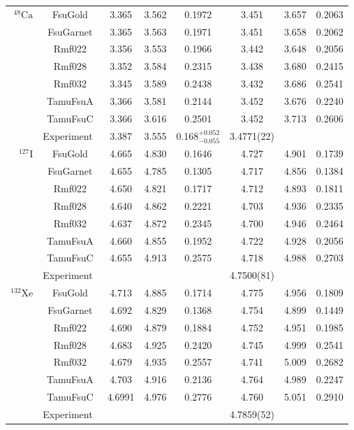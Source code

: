 \begin{longtable}{@{\extracolsep{\fill}}r || c | *{3}{c} | *{3}{c}}
\hline
$^{48}\mathrm{Ca}$ & FsuGold & 3.365 & 3.562 & 0.1972 & 3.451 & 3.657 & 0.2063 \\
 & FsuGarnet & 3.365 & 3.563 & 0.1971 & 3.451 & 3.658 & 0.2062 \\
 & Rmf022 & 3.356 & 3.553 & 0.1966 & 3.442 & 3.648 & 0.2056 \\
 & Rmf028 & 3.352 & 3.584 & 0.2315 & 3.438 & 3.680 & 0.2415 \\
 & Rmf032 & 3.345 & 3.589 & 0.2438 & 3.432 & 3.686 & 0.2541 \\
 & TamuFsuA & 3.366 & 3.581 & 0.2144 & 3.452 & 3.676 & 0.2240 \\
 & TamuFsuC & 3.366 & 3.616 & 0.2501 & 3.452 & 3.713 & 0.2606 \\ \hline 
 & Experiment~\cite{angeli:2013:table, zenihiro:2018:direct} & 3.387 & 3.555 & 0.168$^{+0.052}_{-0.055}$ & 3.4771(22) &  &  \\
\hline
$^{127}\mathrm{I}$ & FsuGold & 4.665 & 4.830 & 0.1646 & 4.727 & 4.901 & 0.1739 \\
 & FsuGarnet & 4.655 & 4.785 & 0.1305 & 4.717 & 4.856 & 0.1384 \\  
 & Rmf022 & 4.650 & 4.821 & 0.1717 & 4.712 & 4.893 & 0.1811 \\  
 & Rmf028 & 4.640 & 4.862 & 0.2221 & 4.703 & 4.936 & 0.2335 \\  
 & Rmf032 & 4.637 & 4.872 & 0.2345 & 4.700 & 4.946 & 0.2464 \\  
 & TamuFsuA & 4.660 & 4.855 & 0.1952 & 4.722 & 4.928 & 0.2056 \\  
 & TamuFsuC & 4.655 & 4.913 & 0.2575 & 4.718 & 4.988 & 0.2703 \\ 
\hline
 & Experiment~\cite{angeli:2013:table} &  &  &  & 4.7500(81) &  &
\\ \hline
$^{132}\mathrm{Xe}$ & FsuGold & 4.713 & 4.885 & 0.1714 & 4.775 & 4.956 & 0.1809 \\ 
 & FsuGarnet & 4.692 & 4.829 & 0.1368 & 4.754 & 4.899 & 0.1449 \\ 
 & Rmf022 & 4.690 & 4.879 & 0.1884 & 4.752 & 4.951 & 0.1985 \\ 
 & Rmf028 & 4.683 & 4.925 & 0.2420 & 4.745 & 4.999 & 0.2541 \\ 
 & Rmf032 & 4.679 & 4.935 & 0.2557 & 4.741 & 5.009 & 0.2682 \\
 & TamuFsuA & 4.703 & 4.916 & 0.2136 & 4.764 & 4.989 & 0.2247 \\
 & TamuFsuC & 4.6991 & 4.976 & 0.2776 & 4.760 & 5.051 & 0.2910 \\ 
\hline
 & Experiment~\cite{angeli:2013:table} &  &  &  & 4.7859(52) &  & \\ 

\end{longtable}
